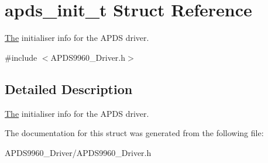 \hypertarget{structapds__init__t}{}\section{apds\+\_\+init\+\_\+t Struct Reference}
\label{structapds__init__t}


\hyperlink{structThe}{The} initialiser info for the A\+P\+DS driver.  




{\ttfamily \#include $<$A\+P\+D\+S9960\+\_\+\+Driver.\+h$>$}



\subsection{Detailed Description}
\hyperlink{structThe}{The} initialiser info for the A\+P\+DS driver. 

The documentation for this struct was generated from the following file\+:\begin{DoxyCompactItemize}
\item 
A\+P\+D\+S9960\+\_\+\+Driver/A\+P\+D\+S9960\+\_\+\+Driver.\+h\end{DoxyCompactItemize}
